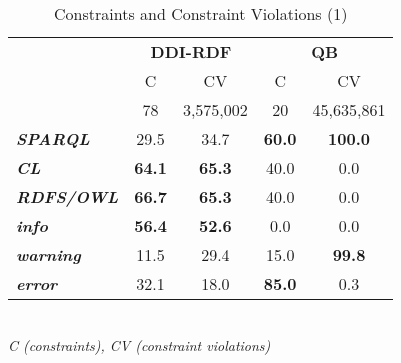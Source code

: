 \documentclass[conference]{IEEEtran}
\begin{document}

\begin{table}[H]
		\scriptsize
    \begin{center}
		\caption{Constraints and Constraint Violations (1)}
		\label{tab:evaluation-constraint-violations-1}
    \begin{tabular}{@{}lcc|cc@{}}
    \multirow{2}{*}{} &
      \multicolumn{2}{c}{\textbf{DDI-RDF}} &
      \multicolumn{2}{c}{\textbf{QB}} \\
    \textbf{} & C & CV & C & CV \\
    \hline
		 & 78 & 3,575,002 & 20 & 45,635,861 \\
		\hline
		\textbf{\emph{SPARQL}} & 29.5 & 34.7 & \textbf{60.0} & \textbf{100.0} \\
		\textbf{\emph{CL}} & \textbf{64.1} & \textbf{65.3} & 40.0 & 0.0 \\
		\textbf{\emph{RDFS/OWL}} & \textbf{66.7} & \textbf{65.3} & 40.0 & 0.0 \\
		\hline
		\textbf{\emph{info}} & \textbf{56.4} & \textbf{52.6} & 0.0 & 0.0 \\
		\textbf{\emph{warning}} & 11.5 & 29.4 & 15.0 & \textbf{99.8} \\
		\textbf{\emph{error}} & 32.1 & 18.0 & \textbf{85.0} & 0.3 \\
    \bottomrule
    \end{tabular}
    \\ \emph{C (constraints), CV (constraint violations)}
    \end{center}
\end{table}
\end{document}
